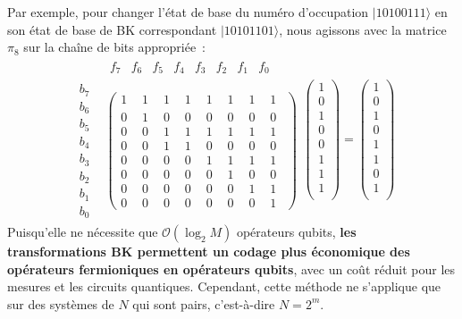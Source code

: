 \documentclass[12pt,a4paper,svgnames,x11names,rgb,table]{article} %
\numberwithin{equation}{section} %
\numberwithin{figure}{section} %
\numberwithin{table}{section} %
\begin{document}
Par exemple, pour changer l'état de base du numéro d'occupation $|1 0 1 0 0 1 1 1\rangle$ en son état de base de BK correspondant $|1 0 1 0 1 1 0 1\rangle$, nous agissons avec la matrice $\pi_8$ sur la chaîne de bits appropriée :
\begin{equation}
    \begin{matrix}
& \begin{matrix}f_7 & f_6 & f_5 & f_4 & f_3 & f_2 & f_1 & f_0 \end{matrix} \\
\begin{matrix}b_7\\b_6\\b_5\\b_4\\b_3\\b_2\\b_1\\b_0\end{matrix}&
\begin{pmatrix} 1_{\phantom{7}} & 1_{\phantom{6}} & 1_{\phantom{5}} & 1_{\phantom{4}} & 1_{\phantom{3}} & 1_{\phantom{2}} & 1_{\phantom{1}} & 1_{\phantom{0}} \\
               0 & 1 & 0 & 0 & 0 & 0 & 0 & 0 \\
               0 & 0 & 1 & 1 & 1 & 1 & 1 & 1 \\
               0 & 0 & 1 & 1 & 0 & 0 & 0 & 0  \\
               0 & 0 & 0 & 0 & 1 & 1 & 1 & 1 \\
               0 & 0 & 0 & 0 & 0 & 1 & 0 & 0 \\
               0 & 0 & 0 & 0 & 0 & 0 & 1 & 1  \\
               0 & 0 & 0 & 0 & 0 & 0 & 0 & 1 
 \end{pmatrix}
\end{matrix}
\begin{pmatrix}
  1 \\
  0 \\
  1 \\
  0 \\
  0 \\
  1 \\
  1 \\
  1\\
 \end{pmatrix}
 =
 \begin{pmatrix}
  1 \\
  0 \\
  1 \\
  0 \\
  1 \\
  1 \\
  0 \\
  1\\
 \end{pmatrix}
\end{equation}
Puisqu'elle ne nécessite que $\mathcal{O}(\log_2 M)$ opérateurs qubits, \textbf{les transformations BK permettent un codage plus économique des opérateurs fermioniques en opérateurs qubits}, avec un coût réduit pour les  mesures et les circuits quantiques. Cependant, cette méthode ne s'applique que sur des systèmes de $N$ qui sont pairs, c'est-à-dire $N=2^m$.
\end{document}
